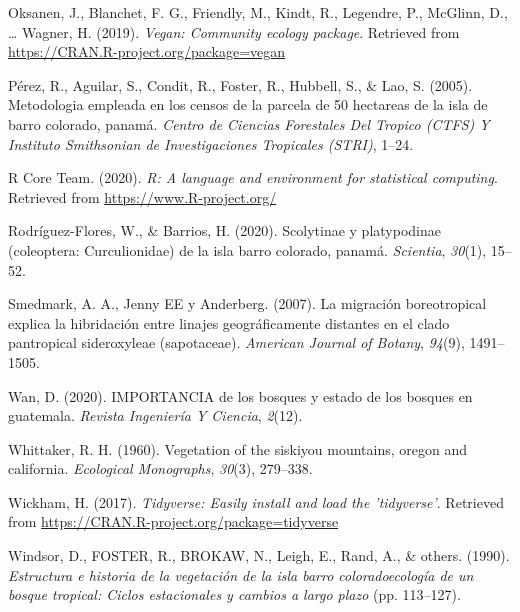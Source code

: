 \documentclass[11pt,]{article}
\begin{document}
\hypertarget{ref-vegan}{}
Oksanen, J., Blanchet, F. G., Friendly, M., Kindt, R., Legendre, P.,
McGlinn, D., \ldots{} Wagner, H. (2019). \emph{Vegan: Community ecology
package}. Retrieved from \url{https://CRAN.R-project.org/package=vegan}

\hypertarget{ref-perez2005metodologia}{}
Pérez, R., Aguilar, S., Condit, R., Foster, R., Hubbell, S., \& Lao, S.
(2005). Metodologia empleada en los censos de la parcela de 50 hectareas
de la isla de barro colorado, panamá. \emph{Centro de Ciencias
Forestales Del Tropico (CTFS) Y Instituto Smithsonian de Investigaciones
Tropicales (STRI)}, 1--24.

\hypertarget{ref-Restudio}{}
R Core Team. (2020). \emph{R: A language and environment for statistical
computing}. Retrieved from \url{https://www.R-project.org/}

\hypertarget{ref-rodriguez2020scolytinae}{}
Rodríguez-Flores, W., \& Barrios, H. (2020). Scolytinae y platypodinae
(coleoptera: Curculionidae) de la isla barro colorado, panamá.
\emph{Scientia}, \emph{30}(1), 15--52.

\hypertarget{ref-smedmark2007boreotropical}{}
Smedmark, A. A., Jenny EE y Anderberg. (2007). La migración
boreotropical explica la hibridación entre linajes geográficamente
distantes en el clado pantropical sideroxyleae (sapotaceae).
\emph{American Journal of Botany}, \emph{94}(9), 1491--1505.

\hypertarget{ref-wan2020importancia}{}
Wan, D. (2020). IMPORTANCIA de los bosques y estado de los bosques en
guatemala. \emph{Revista Ingeniería Y Ciencia}, \emph{2}(12).

\hypertarget{ref-whittaker1960vegetation}{}
Whittaker, R. H. (1960). Vegetation of the siskiyou mountains, oregon
and california. \emph{Ecological Monographs}, \emph{30}(3), 279--338.

\hypertarget{ref-tidyverse}{}
Wickham, H. (2017). \emph{Tidyverse: Easily install and load the
'tidyverse'}. Retrieved from
\url{https://CRAN.R-project.org/package=tidyverse}

\hypertarget{ref-windsorestructura}{}
Windsor, D., FOSTER, R., BROKAW, N., Leigh, E., Rand, A., \& others.
(1990). \emph{Estructura e historia de la vegetación de la isla barro
coloradoecología de un bosque tropical: Ciclos estacionales y cambios a
largo plazo} (pp. 113--127).




\newpage
\singlespacing 
\end{document}
